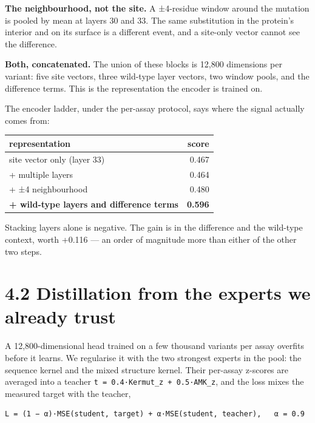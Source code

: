\documentclass[sigconf,review,nonacm]{acmart}
\begin{document}
\textbf{The neighbourhood, not the site.} A ±4-residue window around the mutation is pooled by mean at layers
30 and 33. The same substitution in the protein's interior and on its surface is a different event, and
a site-only vector cannot see the difference.

\textbf{Both, concatenated.} The union of these blocks is 12,800 dimensions per variant: five site vectors,
three wild-type layer vectors, two window pools, and the difference terms. This is the representation the
encoder is trained on.

The encoder ladder, under the per-assay protocol, says where the signal actually comes from:

\begin{table}[t]
\centering
\small
\begin{tabular}{lr}
\hline
representation & score \\
\hline
site vector only (layer 33) & 0.467 \\
+ multiple layers & 0.464 \\
+ ±4 neighbourhood & 0.480 \\
\textbf{+ wild-type layers and difference terms} & \textbf{0.596} \\
\hline
\end{tabular}
\end{table}

Stacking layers alone is negative. The gain is in the difference and the wild-type context, worth
+0.116 --- an order of magnitude more than either of the other two steps.

\hypertarget{distillation-from-the-experts-we-already-trust}{%
\section{4.2 Distillation from the experts we already trust}\label{distillation-from-the-experts-we-already-trust}}

A 12,800-dimensional head trained on a few thousand variants per assay overfits before it learns. We
regularise it with the two strongest experts in the pool: the sequence kernel and the mixed structure
kernel. Their per-assay z-scores are averaged into a teacher \texttt{t\ =\ 0.4·Kermut\_z\ +\ 0.5·AMK\_z}, and the
loss mixes the measured target with the teacher,

\begin{verbatim}
L = (1 − α)·MSE(student, target) + α·MSE(student, teacher),   α = 0.9
\end{verbatim}
\end{document}
